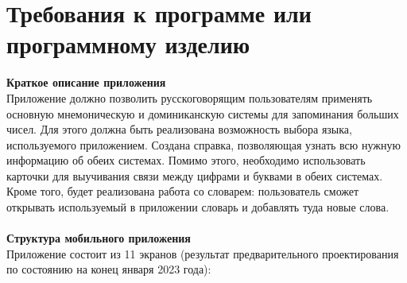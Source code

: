 \documentclass[draft]{article}
\begin{document}
\section {Требования к программе или программному изделию}
\textbf{Краткое описание приложения}\\
Приложение должно позволить русскоговорящим пользователям применять основную мнемоническую и доминиканскую системы для запоминания больших чисел. Для этого должна быть реализована возможность выбора языка, используемого приложением. Создана справка, позволяющая узнать всю нужную информацию об обеих системах. Помимо этого, необходимо использовать карточки для выучивания связи между цифрами и буквами в обеих системах. Кроме того, будет реализована работа со словарем: пользователь сможет открывать используемый в приложении словарь и добавлять туда новые слова.\\
~\\
\textbf{Структура мобильного приложения}\\
Приложение состоит из 11 экранов (результат предварительного проектирования по состоянию на конец января 2023 года):
\end{document}
